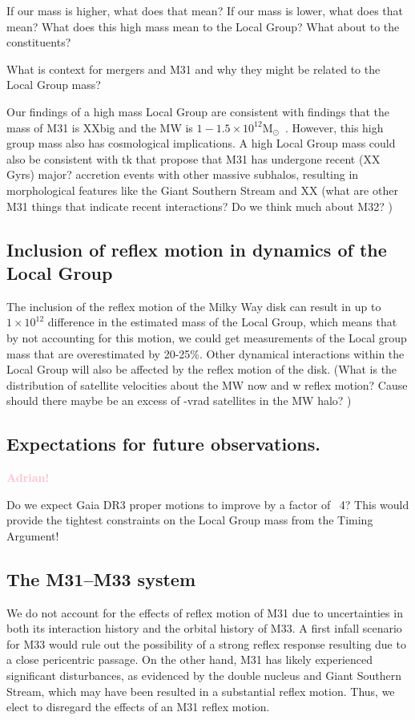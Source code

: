 \documentclass[twocolumn]{aastex631}
\newcommand{\kc}[1]{\textcolor{pink}{\textbf{#1}} }
\newcommand{\msun}{\ensuremath{\textrm{M}_{\odot}}}
\begin{document}
If our mass is higher, what does that mean?
If our mass is lower, what does that mean?
What does this high mass mean to the Local Group? What about to the
constituents?

What is context for mergers and M31 and why they might be
related to the Local Group mass?


Our findings of a high mass Local Group are consistent with findings that the
mass of M31 is XXbig and the MW is $1-1.5\times10^{12}\msun$~\citep{??}.
However, this high group mass also has cosmological implications.
A high Local Group mass could also be consistent with tk that propose that M31
has undergone recent (XX Gyrs) major? accretion events with other massive
subhalos, resulting in morphological features like the Giant Southern Stream and
XX (what are other M31 things that indicate recent interactions? Do we think
much about M32? )

\subsection{Inclusion of reflex motion in dynamics of the Local Group}
The inclusion of the reflex motion of the Milky Way disk can result in up to
$1\times10^{12}$ difference in the estimated mass of the Local Group, which
means that by not accounting for this motion, we could get measurements of the
Local group mass that are overestimated by 20-25\%.
Other dynamical interactions within the Local Group will also be affected by
the reflex motion of the disk. (What is the distribution of satellite velocities
about the MW now and w reflex motion? Cause should there maybe be an excess of
-vrad satellites in the MW halo? )


\subsection{Expectations for future observations.}
\kc{Adrian!}

Do we expect Gaia DR3 proper motions to improve by a factor of ~4?
This would provide the tightest constraints on the Local Group mass from the
Timing Argument!

\subsection{The M31--M33 system}
We do not account for the effects of reflex motion of M31 due to
uncertainties in both its interaction history and the orbital history of
M33.
A first infall scenario for M33 would rule out the possibility of a
strong reflex response resulting due to a close pericentric passage.
On the other hand, M31 has likely experienced significant disturbances, as
evidenced by the double nucleus and Giant Southern Stream,
which may have been resulted in a substantial reflex motion.
Thus, we elect to disregard the effects of an M31 reflex motion.
\end{document}
